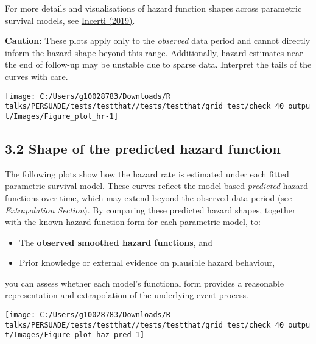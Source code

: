 \documentclass[
]{article}
\providecommand{\tightlist}{%
  \setlength{\itemsep}{0pt}\setlength{\parskip}{0pt}}
\begin{document}
For more details and visualisations of hazard function shapes across
parametric survival models, see
\href{https://devinincerti.com/2019/06/18/parametric_survival.html}{Incerti
(2019)}.

\textbf{Caution:} These plots apply only to the \emph{observed} data
period and cannot directly inform the hazard shape beyond this range.
Additionally, hazard estimates near the end of follow-up may be unstable
due to sparse data. Interpret the tails of the curves with care.

\clearpage

\begin{flushleft}\texttt{[image: C:/Users/g10028783/Downloads/R talks/PERSUADE/tests/testthat//tests/testthat/grid\_test/check\_40\_output/Images/Figure\_plot\_hr-1]} \end{flushleft}

\clearpage

\subsection{3.2 Shape of the predicted hazard
function}\label{shape-of-the-predicted-hazard-function}

The following plots show how the hazard rate is estimated under each
fitted parametric survival model. These curves reflect the model-based
\emph{predicted} hazard functions over time, which may extend beyond the
observed data period (see \emph{Extrapolation Section}). By comparing
these predicted hazard shapes, together with the known hazard function
form for each parametric model, to:

\begin{itemize}
\tightlist
\item
  The \textbf{observed smoothed hazard functions}, and\\
\item
  Prior knowledge or external evidence on plausible hazard behaviour,
\end{itemize}

you can assess whether each model's functional form provides a
reasonable representation and extrapolation of the underlying event
process.

\clearpage

\begin{flushleft}\texttt{[image: C:/Users/g10028783/Downloads/R talks/PERSUADE/tests/testthat//tests/testthat/grid\_test/check\_40\_output/Images/Figure\_plot\_haz\_pred-1]} \end{flushleft}
\end{document}
